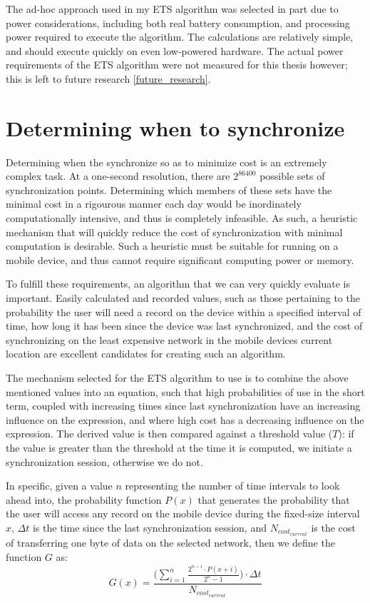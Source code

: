 The ad-hoc approach used in my ETS algorithm was selected in part due to power considerations, including both real battery consumption, and processing power required to execute the algorithm.  The calculations are relatively simple, and should execute quickly on even low-powered hardware.  The actual power requirements of the ETS algorithm were not measured for this thesis however; this is left to future research \ref{future_research}.
  
\section{Determining when to synchronize}\label{when_to_sync}

Determining when the synchronize so as to minimize cost is an extremely complex task.  At a one-second resolution, there are $2^{86400}$ possible sets of synchronization points.  Determining which members of these sets have the minimal cost in a rigourous manner each day would be inordinately computationally intensive, and thus is completely infeasible.  As such, a heuristic mechanism that will quickly reduce the cost of synchronization with minimal computation is desirable.  Such a heuristic must be suitable for running on a mobile device, and thus cannot require significant computing power or memory.

To fulfill these requirements, an algorithm that we can very quickly evaluate is important.  Easily calculated and recorded values, such as those pertaining to the probability the user will need a record on the device within a specified interval of time, how long it has been since the device was last synchronized, and the cost of synchronizing on the least expensive network in the mobile devices current location are excellent candidates for creating such an algorithm.

The mechanism selected for the ETS algorithm to use is to combine the above mentioned values into an equation, such that high probabilities of use in the short term, coupled with increasing times since last synchronization have an increasing influence on the expression, and where high cost has a decreasing influence on the expression.  The derived value is then compared against a threshold value ($T$):  if the value is greater than the threshold at the time it is computed, we initiate a synchronization session, otherwise we do not.

In specific, given a value $n$ representing the number of time intervals to look ahead into, the probability function $P(x)$ that generates the probability that the user will access any record on the mobile device during the fixed-size interval $x$, $\Delta t$ is the time since the last synchronization session, and $N_{cost_{current}}$ is the cost of transferring one byte of data on the selected network, then we define the function $G$ as:
\begin{equation}
G(x) =  \frac{\Bigg(\displaystyle{\sum_{i=1}^n \frac{2^{n-i} \cdot P(x+i)}{2^n-1}}\Bigg)\cdot\Delta t}{N_{cost_{current}}}\label{threshold_function}
\end{equation}

